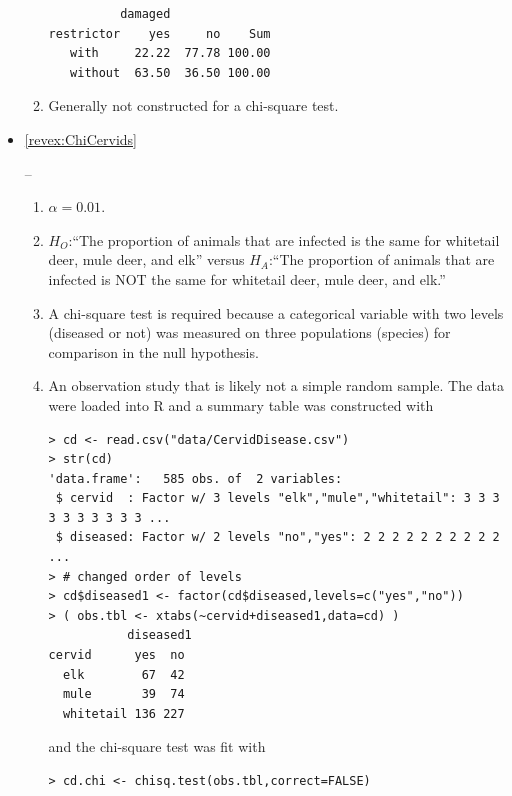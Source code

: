 \documentclass[10pt,openany]{book}\usepackage[]{graphicx}\usepackage[]{color}
\makeatletter
\newenvironment{kframe}{%
 \def\at@end@of@kframe{}%
 \ifinner\ifhmode%
  \def\at@end@of@kframe{\end{minipage}}%
  \begin{minipage}{\columnwidth}%
 \fi\fi%
 \def\FrameCommand##1{\hskip\@totalleftmargin \hskip-\fboxsep
 \colorbox{shadecolor}{##1}\hskip-\fboxsep
     \hskip-\linewidth \hskip-\@totalleftmargin \hskip\columnwidth}%
 \MakeFramed {\advance\hsize-\width
   \@totalleftmargin\z@ \linewidth\hsize
   \@setminipage}}%
 {\par\unskip\endMakeFramed%
 \at@end@of@kframe}
\newenvironment{knitrout}{}{} %
\makeatother
\begin{document}
\begin{itemize}
\begin{enumerate}
\begin{knitrout}
\begin{kframe}
\begin{verbatim}
          damaged
restrictor    yes     no    Sum
   with     22.22  77.78 100.00
   without  63.50  36.50 100.00
\end{verbatim}
\end{kframe}
\end{knitrout}
      \item Generally not constructed for a chi-square test.
    \end{enumerate}
  \item \hypertarget{ans:ChiCervids}{\ref{revex:ChiCervids}} --
    \begin{enumerate}
      \item $\alpha=0.01$.
      \item $H_{O}$:``The proportion of animals that are infected is the same for whitetail deer, mule deer, and elk'' versus $H_{A}$:``The proportion of animals that are infected is NOT the same for whitetail deer, mule deer, and elk.''
      \item A chi-square test is required because a categorical variable with two levels (diseased or not) was measured on three populations (species) for comparison in the null hypothesis.
      \item An observation study that is likely not a simple random sample.  The data were loaded into R and a summary table was constructed with
\begin{knitrout}
\color{fgcolor}\begin{kframe}
\begin{verbatim}
> cd <- read.csv("data/CervidDisease.csv")
> str(cd)
'data.frame':	585 obs. of  2 variables:
 $ cervid  : Factor w/ 3 levels "elk","mule","whitetail": 3 3 3 3 3 3 3 3 3 3 ...
 $ diseased: Factor w/ 2 levels "no","yes": 2 2 2 2 2 2 2 2 2 2 ...
> # changed order of levels
> cd$diseased1 <- factor(cd$diseased,levels=c("yes","no"))
> ( obs.tbl <- xtabs(~cervid+diseased1,data=cd) )
           diseased1
cervid      yes  no
  elk        67  42
  mule       39  74
  whitetail 136 227
\end{verbatim}
\end{kframe}
\end{knitrout}
and the chi-square test was fit with
\begin{knitrout}
\color{fgcolor}\begin{kframe}
\begin{verbatim}
> cd.chi <- chisq.test(obs.tbl,correct=FALSE)
\end{verbatim}

\end{kframe}
\end{knitrout}
\end{enumerate}
\end{itemize}
\end{document}
